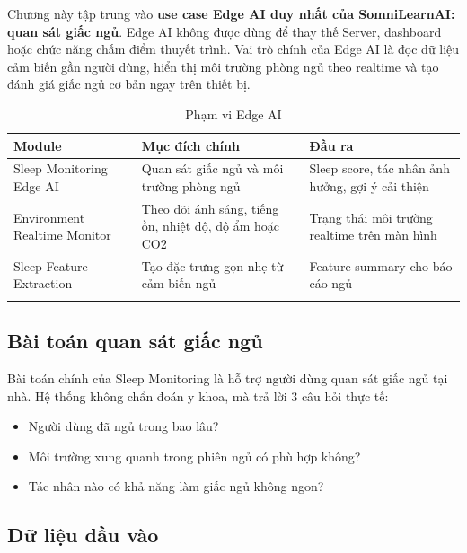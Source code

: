 \documentclass[12pt,a4paper]{article}
\begin{document}
Chương này tập trung vào \textbf{use case Edge AI duy nhất của SomniLearnAI: quan sát giấc ngủ}. Edge AI không được dùng để thay thế Server, dashboard hoặc chức năng chấm điểm thuyết trình. Vai trò chính của Edge AI là đọc dữ liệu cảm biến gần người dùng, hiển thị môi trường phòng ngủ theo realtime và tạo đánh giá giấc ngủ cơ bản ngay trên thiết bị.

\begin{longtable}{|P{3.5cm}|P{5cm}|P{5.5cm}|}
\hline
\textbf{Module} & \textbf{Mục đích chính} & \textbf{Đầu ra} \\
\hline
Sleep Monitoring Edge AI & Quan sát giấc ngủ và môi trường phòng ngủ & Sleep score, tác nhân ảnh hưởng, gợi ý cải thiện \\
\hline
Environment Realtime Monitor & Theo dõi ánh sáng, tiếng ồn, nhiệt độ, độ ẩm hoặc CO2 & Trạng thái môi trường realtime trên màn hình \\
\hline
Sleep Feature Extraction & Tạo đặc trưng gọn nhẹ từ cảm biến ngủ & Feature summary cho báo cáo ngủ \\
\hline
\caption{Phạm vi Edge AI}
\end{longtable}

\subsection{Bài toán quan sát giấc ngủ}

Bài toán chính của Sleep Monitoring là hỗ trợ người dùng quan sát giấc ngủ tại nhà. Hệ thống không chẩn đoán y khoa, mà trả lời 3 câu hỏi thực tế:

\begin{itemize}
    \item Người dùng đã ngủ trong bao lâu?
    \item Môi trường xung quanh trong phiên ngủ có phù hợp không?
    \item Tác nhân nào có khả năng làm giấc ngủ không ngon?
\end{itemize}

\subsection{Dữ liệu đầu vào}
\end{document}
